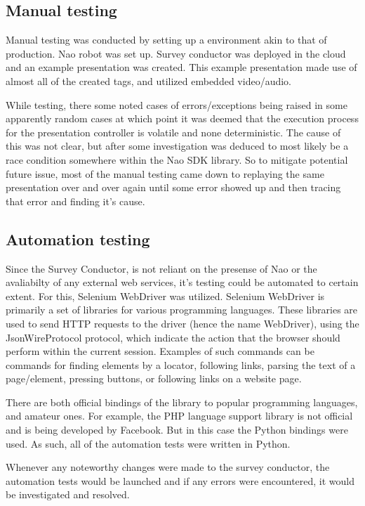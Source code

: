 \documentclass[12pt, fleqn, a4paper]{article}
\begin{document}
\subsection{Manual testing}
Manual testing was conducted by setting up a environment akin to that of production. Nao robot was set up. Survey conductor was deployed in the cloud and an example presentation was created. This example presentation made use of almost all of the created tags, and utilized embedded video/audio.\par
While testing, there some noted cases of errors/exceptions being raised in some apparently random cases at which point it was deemed that the execution process for the presentation controller is volatile and none deterministic. The cause of this was not clear, but after some investigation was deduced to most likely be a race condition somewhere within the Nao SDK library. So to mitigate potential future issue, most of the manual testing came down to replaying the same presentation over and over again until some error showed up and then tracing that error and finding it's cause.\par
\subsection{Automation testing}
Since the Survey Conductor, is not reliant on the presense of Nao or the avaliabilty of any external web services, it's testing could be automated to certain extent. For this, Selenium WebDriver was utilized.
Selenium WebDriver is primarily a set of libraries for various programming languages. These libraries are used to send HTTP requests to the driver (hence the name WebDriver), using the JsonWireProtocol protocol, which indicate the action that the browser should perform within the current session. Examples of such commands can be commands for finding elements by a locator, following links, parsing the text of a page/element, pressing buttons, or following links on a website page.\par
There are both official bindings of the library to popular programming languages, and amateur ones. For example, the PHP language support library is not official and is being developed by Facebook. But in this case the Python bindings were used. As such, all of the automation tests were written in Python.\par
Whenever any noteworthy changes were made to the survey conductor, the automation tests would be launched and if any errors were encountered, it would be investigated and resolved.
\end{document}
